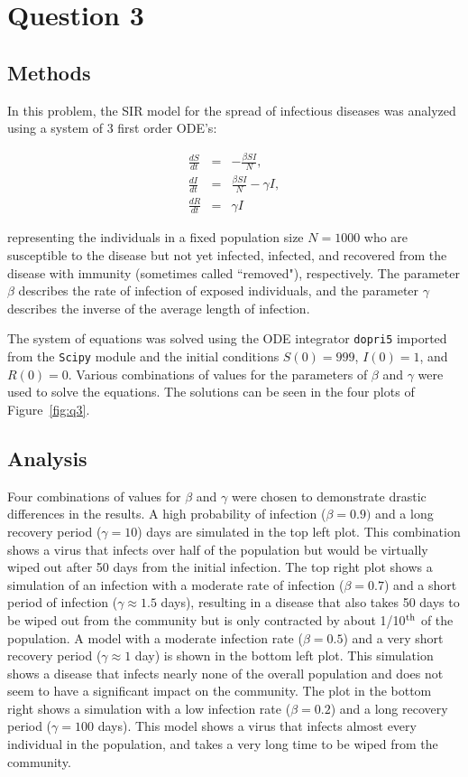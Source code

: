 \documentclass{article}
\begin{document}
\section{Question 3}

\subsection{Methods}
In this problem, the SIR model for the spread of infectious diseases was analyzed using a system of 3 first order ODE's:

\begin{eqnarray}
    \frac{dS}{dt} & = & -\frac{\beta S I}{N}, \\
    \label{eq:S}
    \frac{dI}{dt} & = & \frac{\beta S I}{N} - \gamma I, \\
    \label{eq:I}
    \frac{dR}{dt} & = & \gamma I
    \label{eq:R}
\end{eqnarray}

representing the individuals in a fixed population size $N=1000$ who are susceptible to the disease but not yet infected, infected, and recovered from the disease with immunity (sometimes called ``removed"), respectively.  The parameter $\beta$ describes the rate of infection of exposed individuals, and the parameter $\gamma$ describes the inverse of the average length of infection. 

The system of equations was solved using the ODE integrator {\tt dopri5} imported from the {\tt Scipy} module and the initial conditions $S(0)=999$, $I(0)=1$, and $R(0)=0$.  Various combinations of values for the parameters of $\beta$ and $\gamma$ were used to solve the equations.  The solutions can be seen in the four plots of Figure~\ref{fig:q3}.

\subsection{Analysis}
Four combinations of values for $\beta$ and $\gamma$ were chosen to demonstrate drastic differences in the results.  A high probability of infection ($\beta=0.9)$ and a long recovery period ($\gamma=10$) days are simulated in the top left plot.  This combination shows a virus that infects over half of the population but would be virtually wiped out after 50 days from the initial infection.  The top right plot shows a simulation of an infection with a moderate rate of infection ($\beta=0.7$) and a short period of infection ($\gamma \approx 1.5$ days), resulting in a disease that also takes 50 days to be wiped out from the community but is only contracted by about 1/10$^{\rm{th}}$ of the population.  A model with a moderate infection rate ($\beta=0.5$) and a very short recovery period ($\gamma \approx 1$ day) is shown in the bottom left plot.  This simulation shows a disease that infects nearly none of the overall population and does not seem to have a significant impact on the community.  The plot in the bottom right shows a simulation with a low infection rate ($\beta = 0.2$) and a long recovery period ($\gamma = 100$ days).  This model shows a virus that infects almost every individual in the population, and takes a very long time to be wiped from the community.  
\end{document}
